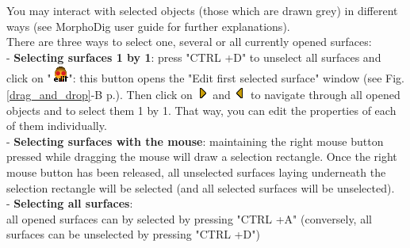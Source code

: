\documentclass[12pt, a4paper]{book}
\begin{document}
You may interact with selected objects (those which are drawn grey) in different ways (see MorphoDig user guide for further explanations).\\
There are three ways to select one, several or all currently opened surfaces:\\
- \textbf{Selecting surfaces 1 by 1}: press "CTRL +D" to unselect all surfaces and click on "\includegraphics[scale=0.7]{../images/06/objects/actor_edit.png}": this button opens the "Edit first selected surface" window (see Fig. \ref{drag_and_drop}-B p.\pageref{drag_and_drop}). Then click on \includegraphics[scale=0.7]{../images/06/objects/s_right.png} and \includegraphics[scale=0.7]{../images/06/objects/s_left.png} to navigate through all opened objects and to select them 1 by 1. That way, you can edit the properties of each of them individually.\\
- \textbf{Selecting surfaces with the mouse}: maintaining the right mouse button pressed while dragging the mouse will draw a selection rectangle. Once the right mouse button has been released, all unselected surfaces laying underneath the selection rectangle will be selected (and all selected surfaces will be unselected).\\
- \textbf{Selecting all surfaces}:\\all opened surfaces can by selected by pressing "CTRL +A" (conversely, all surfaces can be unselected by pressing "CTRL +D")\\
\end{document}
